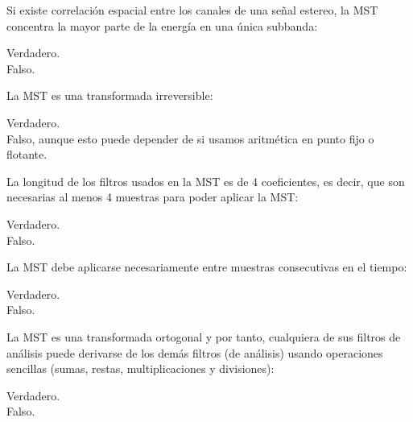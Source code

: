 \documentclass[legalpaper, 12pt, addpoints]{exam}
\begin{document}
\begin{questions}
\question Si existe correlación espacial entre los canales de una
señal estereo, la MST concentra la mayor parte de la energía en una
única subbanda:

\begin{oneparchoices}
  \choice Verdadero.\\
  \choice Falso.
\end{oneparchoices}
  
\vspace{0.10in}

\question La MST es una transformada irreversible:

\begin{oneparchoices}
  \choice Verdadero.\\
  \choice Falso, aunque esto puede depender de si usamos aritmética en punto fijo o flotante.
\end{oneparchoices}
  
\vspace{0.10in}

\question La longitud de los filtros usados en la MST es de 4
coeficientes, es decir, que son necesarias al menos 4 muestras para
poder aplicar la MST:

\begin{oneparchoices}
  \choice Verdadero.\\
  \choice Falso.
\end{oneparchoices}
  
\vspace{0.10in}

\question La MST debe aplicarse necesariamente entre muestras consecutivas en el tiempo:

\begin{oneparchoices}
  \choice Verdadero.\\
  \choice Falso.
\end{oneparchoices}
  
\vspace{0.10in}

\question La MST es una transformada ortogonal y por tanto, cualquiera
de sus filtros de análisis puede derivarse de los demás filtros (de
análisis) usando operaciones sencillas (sumas, restas,
multiplicaciones y divisiones):

\begin{oneparchoices}
  \choice Verdadero.\\
  \choice Falso.
\end{oneparchoices}
  
\vspace{0.10in}


\end{questions}
\end{document}
